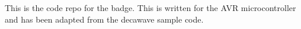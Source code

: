 This is the code repo for the badge. This is written for the A\-V\-R microcontroller and has been adapted from the decawave sample code. 
